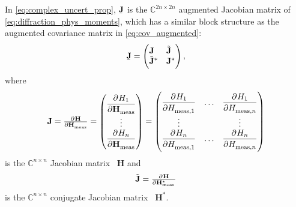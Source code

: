 In \cref{eq:complex_uncert_prop}, $\underaccent{\bar}{\mathbf{J}}$ is
the $\mathbb{C}^{2n \times 2n}$ augmented Jacobian matrix of
\cref{eq:diffraction_phys_moments}, which has a similar block
structure as the augmented covariance matrix in
\cref{eq:cov_augmented}:
\begin{equation}
  \label{eq:J_augmented}
  \underaccent{\bar}{\mathbf{J}}
  = \begin{pmatrix*}[l]
    \mathbf{J} & \tilde{\mathbf{J}} \\
    \tilde{\mathbf{J}}^* & \mathbf{J}^*
  \end{pmatrix*},
\end{equation}
where
\begin{equation}
  \mathbf{J}
  = \pd{\mathbf{H}}{\mathbf{H}_\text{meas}}
  = \begin{pmatrix}
    \dpd{H_1}{\mathbf{H}_\text{meas}} \\
    \vdots \\
    \dpd{H_n}{\mathbf{H}_\text{meas}}
  \end{pmatrix}
  = \begin{pmatrix}
    \dpd{H_1}{H_{\text{meas}, 1}} & \ldots & \dpd{H_1}{H_{\text{meas}, n}} \\
    \vdots & & \vdots \\
    \dpd{H_n}{H_{\text{meas}, 1}} & \ldots & \dpd{H_n}{H_{\text{meas}, n}}
  \end{pmatrix}
\end{equation}
is the $\mathbb{C}^{n \times n}$ Jacobian matrix \wrt~$\mathbf{H}$ and
\begin{equation}
  \tilde{\mathbf{J}}
  = \pd{\mathbf{H}}{{\mathbf{H}_\text{meas}^*}}
\end{equation}
is the $\mathbb{C}^{n \times n}$ conjugate Jacobian matrix
\wrt~$\mathbf{H}^*$.

